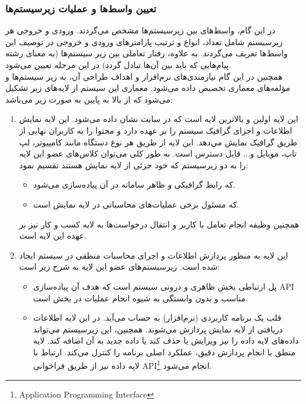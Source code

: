 \documentclass[12pt]{article}
\begin{document}
	\subsubsection{تعیین واسط‌ها و عملیات زیرسیستم‌ها}
	در این گام، واسط‌های بین زیرسیستم‌ها مشخص می‌گردند. ورودی و خروجی هر زیرسیستم شامل تعداد، انواع و ترتیب پارامترهای ورودی و خروجی در توصیف این واسط‌ها تعریف می‌گردند. به علاوه، رفتار تعاملی بین زیر سیستم‌ها (به معنای رشته پیام‌هایی که باید بین آن‌ها تبادل گردد) در این مرحله تعیین می‌شود.\\
	همچنین در این گام نیازمندی‌های نرم‌افزار و اهداف طراحی آن، به زیر سیستم‌ها و مؤلفه‌های معماری تخصیص داده می‌شود.
	معماری این سیستم از لایه‌های زیر تشکیل می‌شود که از بالا به پایین به صورت زیر می‌باشد:

	\begin{enumerate}
		\item {}
		این لایه اولین و بالاترین لایه است که در سایت نشان داده می‌شود. این لایه نمایش اطلاعات و اجزای گرافیک سیستم را بر عهده دارد و محتوا را به کاربران نهایی از طریق گرافیک نمایش می‌دهد. این لایه از طریق هر نوع دستگاه مانند کامپیوتر، لپ تاپ، موبایل و... قابل دسترس است. به طور کلی می‌توان کلاس‌های عضو این لایه را به دو زیرسیستم که خود جزئی از لایه نمایش هستند تقسیم نمود:

		\begin{itemize}
			\item {}
			که رابط گرافیکی و ظاهر سامانه در آن پیاده‌سازی می‌شود.
			\item {}
			که مسئول برخی عملیات‌های محاسباتی در لایه نمایش است.
		\end{itemize}
		همچنین وظیفه انجام تعامل با کاربر و انتقال درخواست‌ها به لایه کسب و کار نیز بر عهده این لایه است.

		\item {}
		این لایه به منظور پردازش اطلاعات و اجرای محاسبات منطقی در سیستم ایجاد شده است. زیرسیستم‌های عضو این لایه به شرح زیر است:

		\begin{itemize}
			\item {}
			پل ارتباطی بخش ظاهری و درونی سیستم است که هدف آن پیاده‌سازی API مناسب و بدون وابستگی به شیوه انجام عملیات در بخش
			است.

			\item {}
			قلب یک برنامه کاربردی (نرم‌افزار) به حساب می‌آید. در این لایه اطلاعات دریافتی از لایه نمایش پردازش می‌شوند. همچنین، این زیرسیستم می‌تواند داده‌های لایه داده را نیز ویرایش یا حذف کند یا داده جدید به آن اضافه کند. لایه منطق با انجام پردازش دقیق، عملکرد اصلی برنامه را کنترل می‌کند. ارتباط با لایه داده نیز از طریق فراخوانی API\footnote{Application Programming Interface} انجام می‌شود.
		\end{itemize}


\end{enumerate}
\end{document}

